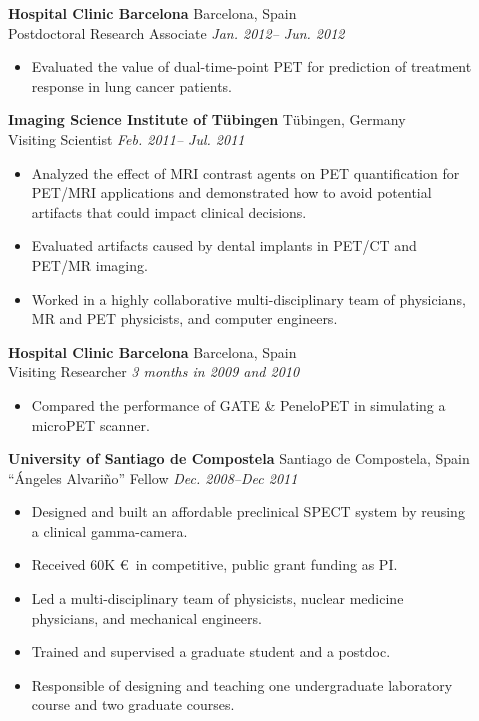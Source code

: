 \documentclass[letterpaper]{article}
\begin{document}
\begin{description}
\item[]
    \textbf{Hospital Clinic Barcelona} \hfill Barcelona, Spain 
\\
Postdoctoral Research Associate \hfill  \textit{Jan. 2012-- Jun. 2012}
\vspace*{-0.2cm}
\begin{itemize}
\item Evaluated the value of dual-time-point PET for prediction of treatment response in lung
cancer patients.
\end{itemize}

\item[] \textbf{Imaging Science Institute of T\"ubingen} \hfill T\"ubingen, Germany \\
Visiting Scientist \hfill  \textit{Feb. 2011-- Jul. 2011} 
\vspace*{-0.2cm}
\begin{itemize}
\item Analyzed the effect of MRI contrast agents on PET quantification for PET/MRI
applications and demonstrated how to avoid potential artifacts that could impact clinical decisions.
\item Evaluated artifacts caused by dental implants in PET/CT and PET/MR imaging.
\item Worked in a highly collaborative multi-disciplinary team of physicians, MR and PET physicists, and computer engineers.  
\end{itemize}

\item[]
    \textbf{Hospital Clinic Barcelona} \hfill Barcelona, Spain \\
Visiting Researcher \hfill  \textit{3 months in 2009 and 2010} 
\begin{itemize}
\item Compared the performance of GATE \& PeneloPET in simulating a microPET
scanner.
\end{itemize}

\item[] \textbf{University of Santiago de Compostela} \hfill Santiago de Compostela, Spain\\
    ``\'Angeles Alvari\~no'' Fellow \hfill \textit{Dec. 2008--Dec 2011}
    \vspace*{-0.2cm}
   \begin{itemize} 
   \item Designed and built an affordable preclinical SPECT system by reusing a clinical gamma-camera. 
    \item Received 60K \euro~in competitive, public grant funding as PI. 
    \item Led a multi-disciplinary team of physicists, nuclear medicine physicians, and mechanical engineers.
    \item Trained and supervised a graduate student and a postdoc. 
    \item Responsible of designing and teaching one undergraduate laboratory course and two graduate courses.  
   \end{itemize} 


\end{description}
\end{document}
